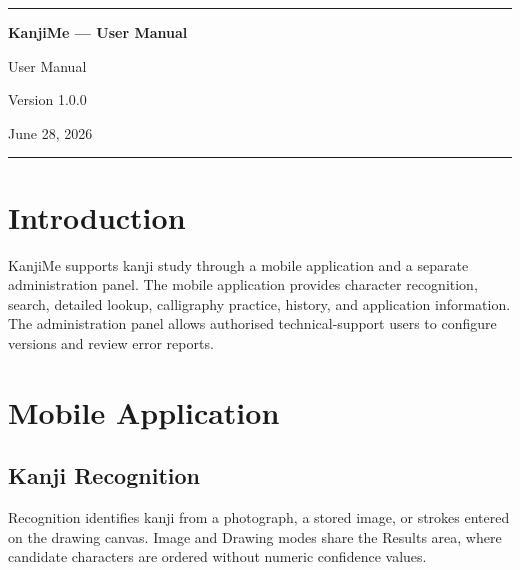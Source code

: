 \documentclass[12pt,a4paper]{article}
\begin{document}
\hypersetup{pageanchor=false}

\begin{titlepage}
  \thispagestyle{empty}
  \centering
  \vspace*{2.5cm}
  {\color{accent}\rule{0.82\textwidth}{2pt}\par}
  \vspace{1.4cm}
  {\Huge\bfseries KanjiMe --- User Manual\par}
  \vspace{0.8cm}
  {\LARGE User Manual\par}
  \vspace{1.6cm}
  {\Large Version 1.0.0\par}
  \vspace{0.4cm}
  {\Large June 28, 2026\par}
  \vfill
  \vspace{1.4cm}
  {\color{accent}\rule{0.82\textwidth}{2pt}\par}
\end{titlepage}

\tableofcontents
\clearpage
\listoffigures
\clearpage
{}
\hypersetup{pageanchor=true}

\newpage
\section{Introduction}

KanjiMe supports kanji study through a mobile application and a separate
administration panel. The mobile application provides character recognition,
search, detailed lookup, calligraphy practice, history, and application
information. The administration panel allows authorised technical-support users
to configure versions and review error reports.

\newpage
\section{Mobile Application}

\subsection{Kanji Recognition}

Recognition identifies kanji from a photograph, a stored image, or strokes
entered on the drawing canvas. Image and Drawing modes share the Results area,
where candidate characters are ordered without numeric confidence values.
\end{document}
